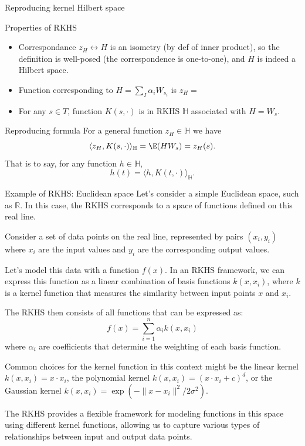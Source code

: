 \begin{frame}[allowframebreaks]{Reproducing kernel Hilbert space}

\begin{alertblock}{Properties of RKHS}
	\begin{itemize}
		\item Correspondance $z_H \leftrightarrow H$ is an isometry (by def of inner product), so the definition is well-posed (the correspondence is one-to-one), and $H$ is indeed a Hilbert space.
		\item Function corresponding to $H=\sum_I \alpha_i W_{s_i}$ is \bigskip
			$z_H=$
		\item For any $s\in T$, function $K(s,\cdot)$ is in RKHS $\mathbb{H}$ associated with $H = W_s$.
	\end{itemize}
\end{alertblock}

\framebreak

\begin{alertblock}{Reproducing formula}
For a general function $z_H \in \mathbb{H}$ we have $$\langle z_H, K(s, \cdot)\rangle_{\mathbb{H}} = \E (H W_s) = z_H(s).$$
That is to say, for any function  $h \in \mathbb{H}$,
	$$h(t) = \langle h, K(t, \cdot)\rangle_{\mathbb{H}}.$$
\end{alertblock}

\end{frame}

\begin{frame}{Example of RKHS: Euclidean space}
Let's consider a simple \alert{Euclidean space}, such as  $\mathbb{R}$. In this case, the RKHS corresponds to a space of functions defined on this real line.

Consider a set of data points on the real line, represented by pairs \((x_i, y_i)\) where \(x_i\) are the input values and \(y_i\) are the corresponding output values.

Let's model this data with a function \(f(x)\). In an RKHS framework, we can express this function as a linear combination of \alert{basis functions} \(k(x, x_i)\), where \(k\) is a  \alert{kernel function} that measures the similarity between input points \(x\) and \(x_i\).

The RKHS then consists of all functions that can be expressed as:
%
\[f(x) = \sum_{i=1}^{n} \alpha_i k(x, x_i)\]
%
where \(\alpha_i\) are coefficients that determine the weighting of each basis function.

Common choices for the kernel function in this context might be the linear kernel \(k(x, x_i) = x \cdot x_i\), the polynomial kernel \(k(x, x_i) = (x \cdot x_i + c)^d\), or the Gaussian kernel \(k(x, x_i) = \exp(-\|x - x_i\|^2 / 2\sigma^2)\).

The RKHS provides a flexible framework for modeling functions in this space using different kernel functions, allowing us to capture various types of relationships between input and output data points.\end{frame}

